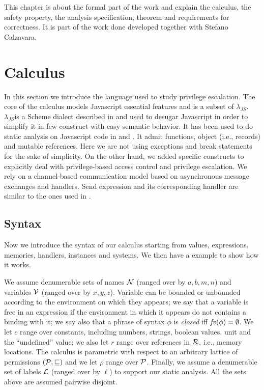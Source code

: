\newcommand{\ljs}{$\lambda_{JS}$}
This chapter is about the formal part of the work and explain the calculus, the safety property, the analysis specification, theorem and requirements for correctness. It is part of the work done developed together with Stefano Calzavara.

\section{Calculus}
\label{sec:Calculus}
In this section we introduce the language used to study privilege escalation. The core of the calculus models Javascript essential features and is a subset of \ljs. \ljs is a Scheme dialect described in \cite{LambdaJS} and used to desugar Javascript in order to simplify it in few construct with easy semantic behavior. It has been used to do static analysis on Javascript code in \cite{Strobe} and \cite{LambdaJSMightVanHorn}. It admit functions, object (i.e., records) and mutable references. Here we are not using exceptions and break statements for the sake of simplicity. On the other hand, we added specific constructs to explicitly deal with privilege-based access control and privilege escalation. We rely on a channel-based communication model based on asynchronous message exchanges and handlers. Send expression and its corresponding handler are similar to the ones used in \cite{Lintent}. 

\subsection{Syntax}
Now we introduce the syntax of our calculus starting from values, expressions, memories, handlers, instances and systems. We then have a example to show how it works.

We assume denumerable sets of names $\mathcal{N}$ (ranged over by $a,b,m,n$) and variables $\mathcal{V}$ (ranged over by $x,y,z$). Variable can be bounded or unbounded according to the environment on which they appears; we say that a variable is free in an expression if the environment in which it appears do not contains a binding with it; we say also that a phrase of syntax $\phi$ is \emph{closed} iff $\mathit{fv}(\phi) = \emptyset$. We let $c$ range over constants, including numbers, strings, boolean values, unit and the ``undefined'' value; we also let $r$ range over references in $\mathcal{R}$, i.e., memory locations. The calculus is parametric with respect to an arbitrary lattice of permissions $(\mathcal{P},\sqsubseteq)$ and we let $\rho$ range over $\mathcal{P}$. Finally, we assume a denumerable set of labels ${\mathcal L}$ (ranged over by $\ell$) to support our static analysis. All the sets above are assumed pairwise disjoint.

